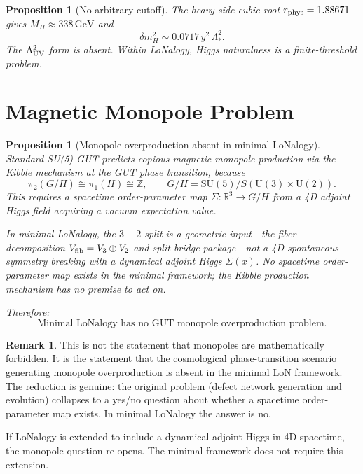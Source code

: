 \documentclass[12pt]{article}
\theoremstyle{plain}
\newtheorem{proposition}[theorem]{Proposition}
\theoremstyle{definition}
\newtheorem{remark}[theorem]{Remark}
\numberwithin{equation}{section}
\begin{document}
\begin{proposition}[No arbitrary cutoff]\label{prop:hierarchy}
The heavy-side cubic root $r_{\rm phys}=1.88671$ gives $M_H\approx338\,\mathrm{GeV}$ and
\[
\boxed{\delta m_H^2 \sim 0.0717\,y^2\,\Lambda_*^2.}
\]
The $\Lambda_{\rm UV}^2$ form is absent.  Within LoNalogy, Higgs naturalness is a finite-threshold problem.
\end{proposition}

\section{Magnetic Monopole Problem}\label{sec:monopole}

\begin{proposition}[Monopole overproduction absent in minimal LoNalogy]\label{prop:monopole}
Standard SU(5) GUT predicts copious magnetic monopole production via the Kibble mechanism at the GUT phase transition, because
\[
\pi_2(G/H) \cong \pi_1(H) \cong \mathbb{Z}, \qquad G/H = \mathrm{SU}(5)/S(\mathrm{U}(3)\times\mathrm{U}(2)).
\]
This requires a spacetime order-parameter map $\Sigma:\mathbb{R}^3\to G/H$ from a 4D adjoint Higgs field acquiring a vacuum expectation value.

In minimal LoNalogy, the $3+2$ split is a \emph{geometric input}---the fiber decomposition $V_{\rm fib}=V_3\oplus V_2$ and split-bridge package---not a 4D spontaneous symmetry breaking with a dynamical adjoint Higgs $\Sigma(x)$.  No spacetime order-parameter map exists in the minimal framework; the Kibble production mechanism has no premise to act on.

Therefore:
\[
\boxed{\text{Minimal LoNalogy has no GUT monopole overproduction problem.}}
\]
\end{proposition}

\begin{remark}
This is not the statement that monopoles are mathematically forbidden.  It is the statement that the cosmological phase-transition scenario generating monopole overproduction is absent in the minimal LoN framework.  The reduction is genuine: the original problem (defect network generation and evolution) collapses to a yes/no question about whether a spacetime order-parameter map exists.  In minimal LoNalogy the answer is no.

If LoNalogy is extended to include a dynamical adjoint Higgs in 4D spacetime, the monopole question re-opens.  The minimal framework does not require this extension.
\end{remark}
\end{document}
